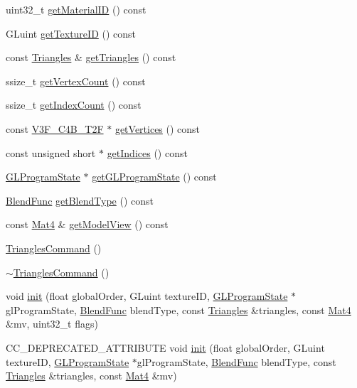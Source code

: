 \begin{DoxyCompactItemize}
\item 
uint32\+\_\+t \hyperlink{classTrianglesCommand_a3a2a112f8201abffa602503c5b612d36}{get\+Material\+ID} () const
\item 
G\+Luint \hyperlink{classTrianglesCommand_a0d523d41e7121d400395a1d30d97ded2}{get\+Texture\+ID} () const
\item 
const \hyperlink{structTrianglesCommand_1_1Triangles}{Triangles} \& \hyperlink{classTrianglesCommand_a6800ca337954a12e6ad0cf1f08ec0ec9}{get\+Triangles} () const
\item 
ssize\+\_\+t \hyperlink{classTrianglesCommand_aca1f762574af533898e639cfb480e2c5}{get\+Vertex\+Count} () const
\item 
ssize\+\_\+t \hyperlink{classTrianglesCommand_ac68263954d42221204fd80a3a20fa927}{get\+Index\+Count} () const
\item 
const \hyperlink{structV3F__C4B__T2F}{V3\+F\+\_\+\+C4\+B\+\_\+\+T2F} $\ast$ \hyperlink{classTrianglesCommand_af10bb83f4fe77a807446b06cd768d171}{get\+Vertices} () const
\item 
const unsigned short $\ast$ \hyperlink{classTrianglesCommand_a00f3fe880696bafdfc7ec8fc76e405b4}{get\+Indices} () const
\item 
\hyperlink{classGLProgramState}{G\+L\+Program\+State} $\ast$ \hyperlink{classTrianglesCommand_a1cf973a55b277ae0a81f3d10db1c0745}{get\+G\+L\+Program\+State} () const
\item 
\hyperlink{structBlendFunc}{Blend\+Func} \hyperlink{classTrianglesCommand_ad86f807326f056256e20ceba83a0a3d1}{get\+Blend\+Type} () const
\item 
const \hyperlink{classMat4}{Mat4} \& \hyperlink{classTrianglesCommand_a6f4d3d4f204b48b653e979d14c8b495f}{get\+Model\+View} () const
\item 
\hyperlink{classTrianglesCommand_ab3741df64d89526f923ae8bd6028a3ab}{Triangles\+Command} ()
\item 
\hyperlink{classTrianglesCommand_a9d5615e7b768aa6c5687a8d196a4f54f}{$\sim$\+Triangles\+Command} ()
\item 
void \hyperlink{classTrianglesCommand_a3957f719246b9bb6e3f6ed68d9d124d0}{init} (float global\+Order, G\+Luint texture\+ID, \hyperlink{classGLProgramState}{G\+L\+Program\+State} $\ast$gl\+Program\+State, \hyperlink{structBlendFunc}{Blend\+Func} blend\+Type, const \hyperlink{structTrianglesCommand_1_1Triangles}{Triangles} \&triangles, const \hyperlink{classMat4}{Mat4} \&mv, uint32\+\_\+t flags)
\item 
C\+C\+\_\+\+D\+E\+P\+R\+E\+C\+A\+T\+E\+D\+\_\+\+A\+T\+T\+R\+I\+B\+U\+TE void \hyperlink{classTrianglesCommand_a5cfa104642ee63bd61bc50062d546f3a}{init} (float global\+Order, G\+Luint texture\+ID, \hyperlink{classGLProgramState}{G\+L\+Program\+State} $\ast$gl\+Program\+State, \hyperlink{structBlendFunc}{Blend\+Func} blend\+Type, const \hyperlink{structTrianglesCommand_1_1Triangles}{Triangles} \&triangles, const \hyperlink{classMat4}{Mat4} \&mv)

\end{DoxyCompactItemize}
